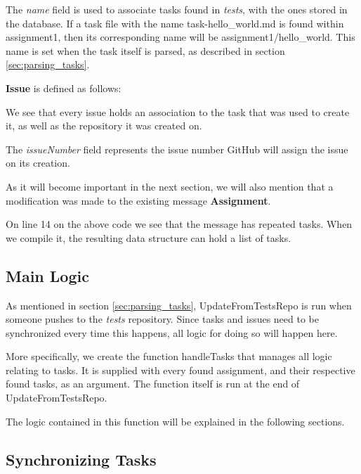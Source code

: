 The \textit{name} field is used to associate tasks found in \textit{tests}, with the ones stored in the database.
If a task file with the name task-hello\_world.md is found within assignment1, then its corresponding name will be assignment1/hello\_world.
This name is set when the task itself is parsed, as described in section \ref{sec:parsing_tasks}.

\textbf{Issue} is defined as follows:



We see that every issue holds an association to the task that was used to create it, as well as the repository it was created on.

The \textit{issueNumber} field represents the issue number GitHub will assign the issue on its creation.

As it will become important in the next section, we will also mention that a modification was made to the existing message \textbf{Assignment}.



On line 14 on the above code we see that the message has repeated tasks.
When we compile it, the resulting data structure can hold a list of tasks.

\subsection{Main Logic}

As mentioned in section \ref{sec:parsing_tasks}, UpdateFromTestsRepo is run when someone pushes to the \textit{tests} repository.
Since tasks and issues need to be synchronized every time this happens, all logic for doing so will happen here.

More specifically, we create the function handleTasks that manages all logic relating to tasks.
It is supplied with every found assignment, and their respective found tasks, as an argument.
The function itself is run at the end of UpdateFromTestsRepo.



The logic contained in this function will be explained in the following sections.

\subsection{Synchronizing Tasks}

